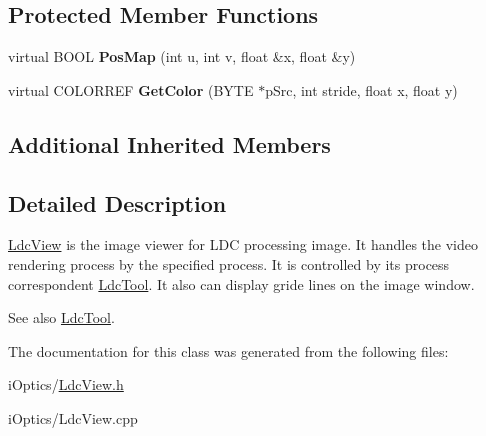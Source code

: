 \subsection*{Protected Member Functions}
\begin{DoxyCompactItemize}
\item 
\mbox{\label{class_ldc_view_af6dc85960c6eb59a8b942fcbdcac287a}} 
virtual B\+O\+OL {\bfseries Pos\+Map} (int u, int v, float \&x, float \&y)
\item 
\mbox{\label{class_ldc_view_a5fff985c99999e4d012a0b8c3f15104c}} 
virtual C\+O\+L\+O\+R\+R\+EF {\bfseries Get\+Color} (B\+Y\+TE $\ast$p\+Src, int stride, float x, float y)
\end{DoxyCompactItemize}
\subsection*{Additional Inherited Members}


\subsection{Detailed Description}
\mbox{\hyperlink{class_ldc_view}{Ldc\+View}} is the image viewer for L\+DC processing image. It handles the video rendering process by the specified process. It is controlled by its process correspondent \mbox{\hyperlink{class_ldc_tool}{Ldc\+Tool}}. It also can display gride lines on the image window. 

\begin{DoxySeeAlso}{See also}
\mbox{\hyperlink{class_ldc_tool}{Ldc\+Tool}}. 
\end{DoxySeeAlso}


The documentation for this class was generated from the following files\+:\begin{DoxyCompactItemize}
\item 
i\+Optics/\mbox{\hyperlink{_ldc_view_8h}{Ldc\+View.\+h}}\item 
i\+Optics/Ldc\+View.\+cpp\end{DoxyCompactItemize}
